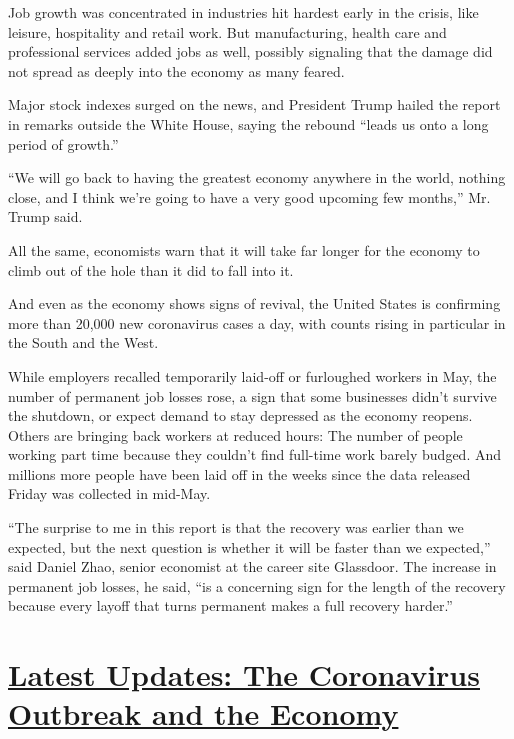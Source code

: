 Job growth was concentrated in industries hit hardest early in the
crisis, like leisure, hospitality and retail work. But manufacturing,
health care and professional services added jobs as well, possibly
signaling that the damage did not spread as deeply into the economy as
many feared.

Major stock indexes surged on the news, and President Trump hailed the
report in remarks outside the White House, saying the rebound ``leads us
onto a long period of growth.''

``We will go back to having the greatest economy anywhere in the world,
nothing close, and I think we're going to have a very good upcoming few
months,'' Mr. Trump said.

All the same, economists warn that it will take far longer for the
economy to climb out of the hole than it did to fall into it.

And even as the economy shows signs of revival, the United States is
confirming more than 20,000 new coronavirus cases a day, with counts
rising in particular in the South and the West.

While employers recalled temporarily laid-off or furloughed workers in
May, the number of permanent job losses rose, a sign that some
businesses didn't survive the shutdown, or expect demand to stay
depressed as the economy reopens. Others are bringing back workers at
reduced hours: The number of people working part time because they
couldn't find full-time work barely budged. And millions more people
have been laid off in the weeks since the data released Friday was
collected in mid-May.

``The surprise to me in this report is that the recovery was earlier
than we expected, but the next question is whether it will be faster
than we expected,'' said Daniel Zhao, senior economist at the career
site Glassdoor. The increase in permanent job losses, he said, ``is a
concerning sign for the length of the recovery because every layoff that
turns permanent makes a full recovery harder.''

\hypertarget{latest-updates-the-coronavirus-outbreak-and-the-economy}{%
\section{\texorpdfstring{\href{https://www.nytimes3xbfgragh.onion/live/2020/08/20/business/stock-market-today-coronavirus?action=click\&pgtype=Article\&state=default\&region=MAIN_CONTENT_1\&context=storylines_live_updates}{Latest
Updates: The Coronavirus Outbreak and the
Economy}}{Latest Updates: The Coronavirus Outbreak and the Economy}}\label{latest-updates-the-coronavirus-outbreak-and-the-economy}}

